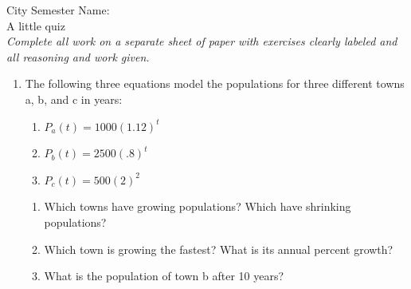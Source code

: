 \documentclass[12pt]{article}
\theoremstyle{plain}     %
\begin{document}
\large
City Semester  \hspace{8cm} Name:\makebox[6cm]{\hrulefill}
\\
A little quiz\\
\normalsize 
\emph{Complete all work on a separate sheet of paper with exercises clearly labeled and all reasoning and work given.}\\[.5cm]
\begin{enumerate}
	\item The following three equations model the populations for three different towns a, b, and c in years:
		\begin{enumerate}[label=(\roman*)]
			\item $P_a(t)=1000(1.12)^t$\\
			\item $P_b(t)=2500(.8)^t$\\
			\item $P_c(t)=500(2)^2$\\
		\end{enumerate}
		\begin{enumerate}
			\item Which towns have growing populations? Which have shrinking populations?
			\item Which town is growing the fastest? What is its annual percent growth?
			\item What is the population of town b after 10 years?
		\end{enumerate}
	


\end{enumerate}
\end{document}
